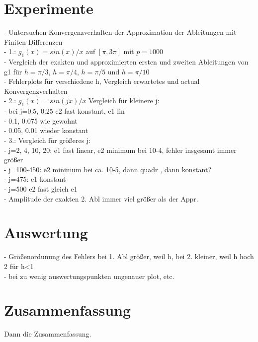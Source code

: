 \documentclass{scrartcl}
\begin{document}
\section{Experimente}
\label{sec:experiment}
- Untersuchen Konvergenzverhalten der Approximation der Ableitungen mit Finiten Differenzen\\
- 1.: $g_1(x)=sin(x)/x$ auf $[\pi,3\pi]$ mit $p=1000$\\
- Vergleich der exakten und approximierten ersten und zweiten Ableitungen von g1 für $h = \pi/3$, $h = \pi/4$, $h = \pi/5$ und $h = \pi/10$\\
- Fehlerplots für verschiedene h, Vergleich erwartetes und actual Konvergenzverhalten\\

- 2.: $g_1(x)=sin(jx)/x$  Vergleich für kleinere j: \\
- bei j=0.5, 0.25 e2 fast konstant, e1 lin\\
- 0.1, 0.075 wie gewohnt\\
- 0.05, 0.01 wieder konstant\\
- 3.: Vergleich für größeres j:\\
- j=2, 4, 10, 20: e1 fast linear, e2 minimum bei 10-4, fehler insgesamt immer größer\\
- j=100-450: e2 minimum bei ca. 10-5, dann quadr , dann konstant?\\
- j=475: e1 konstant\\
- j=500 e2 fast gleich e1\\

- Amplitude der exakten 2. Abl immer viel größer als der Appr.
\section{Auswertung}
\label{sec:auswertung}
- Größenordunung des Fehlers bei 1. Abl größer, weil h, bei 2. kleiner, weil h hoch 2 für h<1\\
- bei zu wenig auswertungspunkten ungenauer plot, etc.\\

\section{Zusammenfassung}
\label{sec:zusammenfassung}
Dann die Zusammenfassung.
\end{document}
